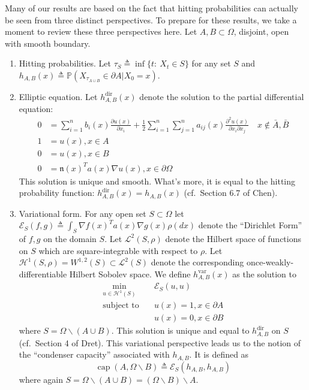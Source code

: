 \documentclass[12pt, nofootinbib,english, amsmath, amssymb, aps, priprint, graphicx,floatfix]{revtex4-1}
\theoremstyle{plain}
\theoremstyle{definition}
\theoremstyle{plain}
\newcommand{\normal}{{\mathfrak{n}}}
\newcommand{\capac}[2]{\ensuremath{\operatorname{cap}}(#1,#2)}
\begin{document}
Many of our results are based on the fact that hitting probabilities can actually be seen from three distinct perspectives.  To prepare for these results, we take a moment to review these three perspectives here.  Let $A,B\subset \Omega$, disjoint, open with smooth boundary.

\begin{enumerate}
\item Hitting probabilities.  Let $\tau_S \triangleq \inf\{t:\ X_t \in S\}$ for any set $S$ and $h_{A,B}(x) \triangleq \mathbb{P}(X_{\tau_{A\cup B}}\in \partial A|X_0=x)$.

\item Elliptic equation.  Let $h^\mathrm{dir}_{A,B}(x)$ denote the solution to the partial differential equation:
	    \begin{align}\label{eq:pde}
    0 &= \sum_{i = 1}^n b_i (x) \frac{\partial u
        (x)}{\partial x_i} + \frac{1}{2} \sum_{i = 1}^n \sum_{j = 1}^n a_{ij} (x)
        \frac{\partial^2 u (x)}{\partial x_i \partial x_j}\quad x\notin \bar A,\bar B\\
    1 &= u(x),x\in  A \nonumber \\
    0 &= u(x),x\in  B \nonumber \\
    0 &= \normal(x)^Ta(x)\nabla u(x), x \in \partial{\Omega}
    \nonumber
    \end{align}
This solution is unique and smooth.\cite{lieberman1986mixed}  What's more, it is equal to the hitting probability function: $h^\mathrm{dir}_{A,B}(x)=h_{A,B}(x)$ (cf.\ Section 6.7 of Chen\cite{chen2012symmetric}).
\item Variational form.  For any open set $S\subset \Omega$ let $\mathscr{E}_{S}(f,g)\triangleq \int_S \nabla f(x)^T a(x) \nabla g(x) \rho(dx)$ denote the ``Dirichlet Form'' of $f,g$ on the domain $S$.  Let $\mathscr L^2(S,\rho)$ denote the Hilbert space of functions on $S$ which are square-integrable with respect to $\rho$.  Let $\mathcal{H}^1(S,\rho)=W^{1,2}(S) \subset \mathscr{L}^2(S)$ denote the corresponding once-weakly-differentiable Hilbert Sobolev space.  We define $h^\mathrm{var}_{A,B}(x)$ as the solution to
    \begin{align*}
    \min_{u \in \mathcal H^1(S)} \quad & \mathscr{E}_S(u,u) \\
    \mbox{subject to} \quad & u(x)=1,x\in \partial A \\
     & u(x)=0,x\in \partial B
    \end{align*}
    where $S=\Omega \backslash (A\cup B)$.  This solution is unique and equal to $h^\mathrm{dir}_{A,B}$ on $S$ (cf.\ Section 4 of Dret\cite{dret2016partial}).
This variational perspective leads us to the notion of the ``condenser capacity'' associated with $h_{A,B}$.  It is defined as
    \[
    \capac{A}{\Omega \backslash B} \triangleq \mathscr{E}_S(h_{A,B},h_{A,B})
    \]
    where again $S=\Omega \backslash (A\cup B)=(\Omega \backslash B) \backslash A$.
\end{enumerate}
\end{document}
